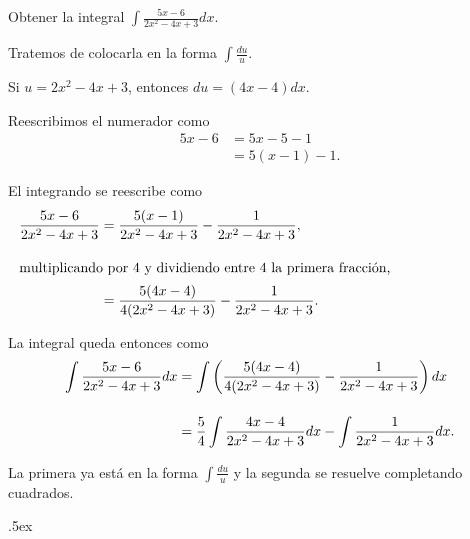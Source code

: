 \documentclass[12pt,letterpaper]{article}
\author{\textsc{Manuel López Mateos}}
\newcommand{\fej}{\relax\hfill\ifmmode{\lower.5ex\hbox{{\textcolor{blue}{\LARGE\smiley al 15pt}}}}\else\lower.5ex\hbox{{\textcolor{blue}{\LARGE \smiley}}}}  %
\begin{document}
Obtener la integral $\displaystyle\int \frac{5x-6}{2x^2-4x+3}dx$.

\bigskip
Tratemos de colocarla en la forma $\displaystyle\int \frac{du}{u}$. 

\smallskip
Si $u=2x^2-4x+3$, entonces $du=(4x-4)dx$.

\medskip
Reescribimos el numerador como
\begin{align*}
5x-6&=5x-5-1\\
&=5(x-1)-1.
\end{align*}

El integrando se reescribe como
\begin{align*}
\frac{5x-6}{2x^2-4x+3}&=\frac{5(x-1)}{2x^2-4x+3}-\frac{1}{2x^2-4x+3},\\
\noalign{\bigskip\noindent\text multiplicando por $4$ y dividiendo entre $4$ la primera fracción,\smallskip}
&=\frac{5(4x-4)}{4(2x^2-4x+3)}-\frac{1}{2x^2-4x+3}.
\end{align*}

La integral queda entonces como
\begin{align*}
\int \frac{5x-6}{2x^2-4x+3}dx&=\int\left(\frac{5(4x-4)}{4(2x^2-4x+3)}-\frac{1}{2x^2-4x+3}\right)dx\\
\noalign{\bigskip}
&=\frac{5}{4}\int\frac{4x-4}{2x^2-4x+3}dx-\int\frac{1}{2x^2-4x+3}dx.
\end{align*}

La primera ya está en la forma $\displaystyle\int \frac{du}{u}$ y la segunda se resuelve completando cuadrados.

\fej
\end{document}
